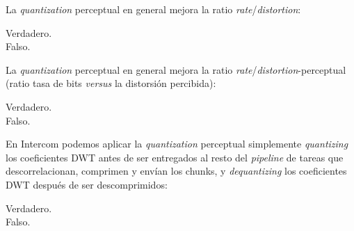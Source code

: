 \documentclass[legalpaper, 12pt, addpoints]{exam}
\begin{document}
\begin{questions}
\question La \emph{quantization} perceptual en general mejora la ratio
\emph{rate}/\emph{distortion}:

\begin{oneparchoices}
  \choice Verdadero.\\
  \choice Falso.
\end{oneparchoices}
  
\vspace{0.10in}

\question La \emph{quantization} perceptual en general mejora la ratio
\emph{rate}/\emph{distortion}-perceptual (ratio tasa de bits
\emph{versus} la distorsión percibida):

\begin{oneparchoices}
  \choice Verdadero.\\
  \choice Falso.
\end{oneparchoices}

\vspace{0.10in}

\question En Intercom podemos aplicar la \emph{quantization}
perceptual simplemente \emph{quantizing} los coeficientes DWT antes de
ser entregados al resto del \emph{pipeline} de tareas que
descorrelacionan, comprimen y envían los chunks, y \emph{dequantizing}
los coeficientes DWT después de ser descomprimidos:

\begin{oneparchoices}
  \choice Verdadero.\\
  \choice Falso.
\end{oneparchoices}

\vspace{0.10in}

\vspace{0.25in} {}

\end{questions}
\end{document}
